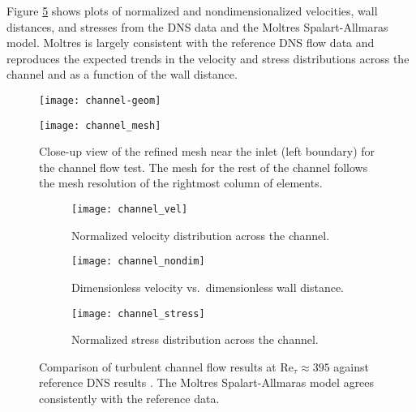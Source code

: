 Figure \ref{fig:channel-verification} shows plots of normalized and nondimensionalized velocities,
wall distances, and stresses from the \gls{DNS} data \cite{moser_direct_1999}
and the Moltres Spalart-Allmaras model. Moltres is largely consistent with the reference
\gls{DNS} flow data and reproduces the expected trends in the velocity and stress distributions
across the channel and as a function of the wall distance.
%
\begin{figure}[h!]
  \centering
  \texttt{[image: channel-geom]}
  \caption{Channel geometry for the turbulent channel flow verification test. The red box indicates
  the region shown by the close-up view in Figure \ref{fig:channel-mesh}.}
  \label{fig:channel-geom}
  \vspace{.5cm}
  \texttt{[image: channel\_mesh]}
  \caption{Close-up view of the refined mesh near the inlet (left boundary) for the channel flow
    test. The mesh for the rest of the channel follows the mesh resolution of the rightmost column
  of elements.}
  \label{fig:channel-mesh}
\end{figure}

\begin{figure}[p]
  \centering
  \begin{subfigure}[b]{0.48\columnwidth}
    \centering
    \texttt{[image: channel\_vel]}
    \caption{Normalized velocity distribution across the channel.}
    \label{fig:channel-vel}
  \end{subfigure}
  \hfill
  \begin{subfigure}[b]{0.48\columnwidth}
    \centering
    \texttt{[image: channel\_nondim]}
    \caption{Dimensionless velocity vs.\ dimensionless wall distance.}
    \label{fig:channel-nondim}
  \end{subfigure}
  \begin{subfigure}[b]{0.48\columnwidth}
    \centering
    \texttt{[image: channel\_stress]}
    \caption{Normalized stress distribution across the channel.}
    \label{fig:channel-stress}
  \end{subfigure}
  \caption{Comparison of turbulent channel flow results at Re$_\tau\approx395$ against reference
  \gls{DNS} results \cite{moser_direct_1999}. The Moltres Spalart-Allmaras model agrees consistently with
  the reference data.}
  \label{fig:channel-verification}
\end{figure}

\FloatBarrier

